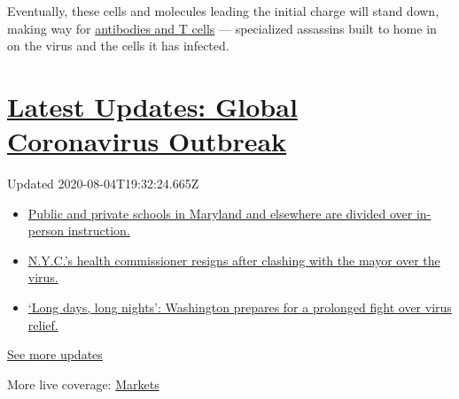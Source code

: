 Eventually, these cells and molecules leading the initial charge will
stand down, making way for
\href{https://www.nytimes.com/2020/07/26/health/coronvirus-antibody-tests.html}{antibodies
and T cells} --- specialized assassins built to home in on the virus and
the cells it has infected.

\hypertarget{latest-updates-global-coronavirus-outbreak}{%
\section{\texorpdfstring{\href{https://www.nytimes.com/2020/08/04/world/coronavirus-cases.html?action=click\&pgtype=Article\&state=default\&region=MAIN_CONTENT_1\&context=storylines_live_updates}{Latest
Updates: Global Coronavirus
Outbreak}}{Latest Updates: Global Coronavirus Outbreak}}\label{latest-updates-global-coronavirus-outbreak}}

Updated 2020-08-04T19:32:24.665Z

\begin{itemize}
\tightlist
\item
  \href{https://www.nytimes.com/2020/08/04/world/coronavirus-cases.html?action=click\&pgtype=Article\&state=default\&region=MAIN_CONTENT_1\&context=storylines_live_updates\#link-4825b93}{Public
  and private schools in Maryland and elsewhere are divided over
  in-person instruction.}
\item
  \href{https://www.nytimes.com/2020/08/04/world/coronavirus-cases.html?action=click\&pgtype=Article\&state=default\&region=MAIN_CONTENT_1\&context=storylines_live_updates\#link-4d1eafa8}{N.Y.C.'s
  health commissioner resigns after clashing with the mayor over the
  virus.}
\item
  \href{https://www.nytimes.com/2020/08/04/world/coronavirus-cases.html?action=click\&pgtype=Article\&state=default\&region=MAIN_CONTENT_1\&context=storylines_live_updates\#link-6b644638}{`Long
  days, long nights': Washington prepares for a prolonged fight over
  virus relief.}
\end{itemize}

\href{https://www.nytimes.com/2020/08/04/world/coronavirus-cases.html?action=click\&pgtype=Article\&state=default\&region=MAIN_CONTENT_1\&context=storylines_live_updates}{See
more updates}

More live coverage:
\href{https://www.nytimes.com/live/2020/08/04/business/stock-market-today-coronavirus?action=click\&pgtype=Article\&state=default\&region=MAIN_CONTENT_1\&context=storylines_live_updates}{Markets}

